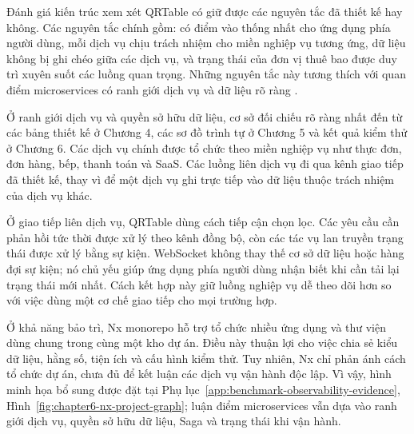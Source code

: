 Đánh giá kiến trúc xem xét QRTable có giữ được các nguyên tắc đã thiết kế hay không. Các nguyên tắc chính gồm: có điểm vào thống nhất cho ứng dụng phía người dùng, mỗi dịch vụ chịu trách nhiệm cho miền nghiệp vụ tương ứng, dữ liệu không bị ghi chéo giữa các dịch vụ, và trạng thái của đơn vị thuê bao được duy trì xuyên suốt các luồng quan trọng. Những nguyên tắc này tương thích với quan điểm microservices có ranh giới dịch vụ và dữ liệu rõ ràng \cite{lewis-fowler-microservices-2014,newman-building-microservices-2021}.

Ở ranh giới dịch vụ và quyền sở hữu dữ liệu, cơ sở đối chiếu rõ ràng nhất đến từ các bảng thiết kế ở Chương 4, các sơ đồ trình tự ở Chương 5 và kết quả kiểm thử ở Chương 6. Các dịch vụ chính được tổ chức theo miền nghiệp vụ như thực đơn, đơn hàng, bếp, thanh toán và SaaS. Các luồng liên dịch vụ đi qua kênh giao tiếp đã thiết kế, thay vì để một dịch vụ ghi trực tiếp vào dữ liệu thuộc trách nhiệm của dịch vụ khác.

Ở giao tiếp liên dịch vụ, QRTable dùng cách tiếp cận chọn lọc. Các yêu cầu cần phản hồi tức thời được xử lý theo kênh đồng bộ, còn các tác vụ lan truyền trạng thái được xử lý bằng sự kiện. WebSocket không thay thế cơ sở dữ liệu hoặc hàng đợi sự kiện; nó chủ yếu giúp ứng dụng phía người dùng nhận biết khi cần tải lại trạng thái mới nhất. Cách kết hợp này giữ luồng nghiệp vụ dễ theo dõi hơn so với việc dùng một cơ chế giao tiếp cho mọi trường hợp.

Ở khả năng bảo trì, Nx monorepo hỗ trợ tổ chức nhiều ứng dụng và thư viện dùng chung trong cùng một kho dự án. Điều này thuận lợi cho việc chia sẻ kiểu dữ liệu, hằng số, tiện ích và cấu hình kiểm thử. Tuy nhiên, Nx chỉ phản ánh cách tổ chức dự án, chưa đủ để kết luận các dịch vụ vận hành độc lập. Vì vậy, hình minh họa bổ sung được đặt tại Phụ lục~\ref{app:benchmark-observability-evidence}, Hình~\ref{fig:chapter6-nx-project-graph}; luận điểm microservices vẫn dựa vào ranh giới dịch vụ, quyền sở hữu dữ liệu, Saga và trạng thái khi vận hành.

